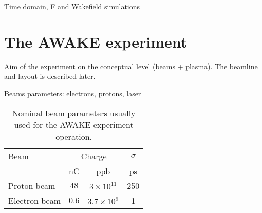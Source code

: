 Time domain, F and Wakefield simulations

\section[The AWAKE experiment]{The AWAKE experiment}

Aim of the experiment on the conceptual level (beams + plasma). The beamline and layout is described later.

Beams parameters: electrons, protons, laser

\begin{table}[ht]
  \centering
    \begin{tabular}{l c c c}
    \toprule
    Beam  & \multicolumn{2}{c}{Charge} & $\sigma$\\
          & nC & ppb & ps\\
    \midrule
    Proton beam								& $48$	  & $3\times10^{11}$	& 250	\\
    Electron beam							& $0.6$	  & $3.7\times10^{9}$	& 1		\\
    \bottomrule
    \end{tabular}
  \caption{Nominal beam parameters usually used for the AWAKE experiment operation.} \label{beam_param_exp:tab}
\end{table}
